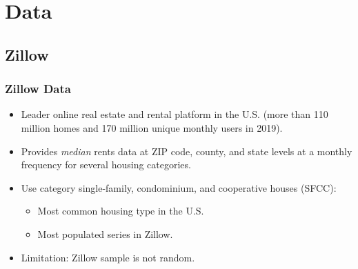 \documentclass[aspectratio=169]{beamer}
\begin{document}
\begin{frame}
\begin{columns}
\begin{column}{0.50\textwidth}
\begin{figure}
            \end{figure}   
        \end{column}
    \end{columns}
\end{frame}

\section{Data}

\subsection{Zillow}

\begin{frame}[label = zillow]
	\frametitle{Zillow Data}
	
	\begin{itemize}
		\item Leader online real estate and rental platform in the U.S. {\small (more 
		than 110 million homes and 170 million unique monthly users in 2019).}
		
		\vspace{2mm} \item
		Provides \textit{median} rents data at ZIP code, county, and state levels 
		at a monthly frequency for several housing categories.
		
		\pause
		\vspace{2mm} \item
		Use category single-family, condominium, and cooperative houses (SFCC):
		\begin{itemize}
			\item Most common housing type in the U.S.
			\item Most populated series in Zillow.
		\end{itemize}
		
		\pause
		\vspace{2mm} \item
		Limitation: Zillow sample is not random.
	\end{itemize}
\end{frame}
\end{document}
